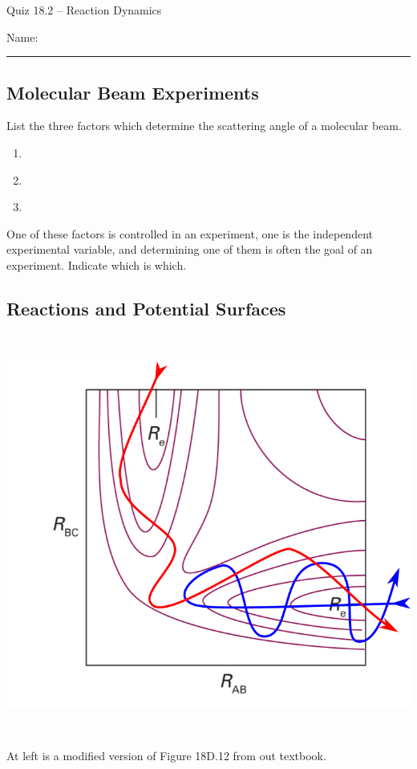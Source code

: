 \documentclass[11pt, letterpaper]{memoir}
\begin{document}
	\begin{center}
		{\large Quiz 18.2 -- Reaction Dynamics}
	\end{center}
	{\large Name: \rule[-1mm]{4in}{.1pt} 

\subsection*{Molecular Beam Experiments}

List the three factors which determine the scattering angle of a molecular beam. 
\begin{enumerate}
	\item ~
	\item ~
	\item ~
\end{enumerate}

\noindent One of these factors is controlled in an experiment, one is the independent experimental variable, and determining one of them is often the goal of an experiment. Indicate which is which.


\subsection*{Reactions and Potential Surfaces}

\noindent
~ \hspace{-6em}
\begin{minipage}{0.5\linewidth}
	\includegraphics[width=\linewidth]{PE_Surface}
\end{minipage} ~ ~ 
\begin{minipage}{0.65\linewidth}\noindent
At left is a modified version of Figure 18D.12 from out textbook.


\end{minipage}}
\end{document}
